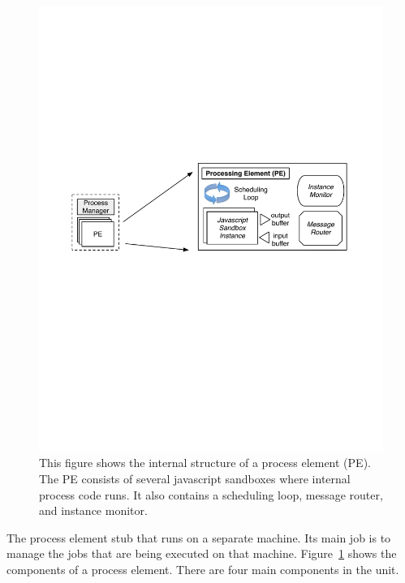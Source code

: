 \begin{figure}[th!] %
\centering
\includegraphics[width=0.85\columnwidth]{figs/pe_internals}
\caption{This figure shows the internal structure of a process element (PE).  The PE consists of several
javascript sandboxes where internal process code runs.  It also contains a scheduling loop, message router, and instance 
monitor.}
\label{fig:pe_internals}
\end{figure}


The process element stub that runs on a separate machine.  Its main job is to manage the jobs that are being executed on that
machine.  Figure~\ref{fig:pe_internals} shows the components of a process element.  There are four main components in the unit.

